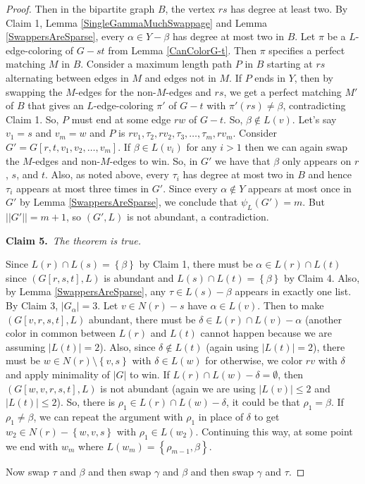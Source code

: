 \documentclass[12pt]{article}
\theoremstyle{plain}
\theoremstyle{definition}
\theoremstyle{remark}
\newcommand{\set}[1]{\left\{ #1 \right\}}
\newcommand{\claim}[2]{{\bf Claim #1.}~{\it #2}~~}
\begin{document}
\begin{proof}
			Then in the bipartite graph $B$, the vertex $rs$ has degree at least two.  By Claim 1, Lemma \ref{SingleGammaMuchSwappage} and Lemma \ref{SwappersAreSparse}, every $\alpha \in Y - \beta$ has degree at most two in $B$.  Let $\pi$ be a $L$-edge-coloring of $G-st$ from Lemma \ref{CanColorG-t}.  Then $\pi$ specifies a perfect matching $M$ in $B$.  Consider a maximum length path $P$ in $B$ starting at $rs$ alternating between edges in $M$ and edges not in $M$.  
			If $P$ ends in $Y$, then by swapping the $M$-edges for the non-$M$-edges and $rs$, we get a perfect matching $M'$ of $B$ that gives an $L$-edge-coloring $\pi'$ of $G-t$ with $\pi'(rs) \ne \beta$, contradicting Claim 1.  So, $P$ must end at some edge $rw$ of $G - t$.   So, $\beta \not \in L(v)$.  Let's say $v_1 = s$ and $v_m = w$ and $P$ is $rv_1,\tau_2, rv_2, \tau_3, \ldots, \tau_m, rv_m$.  Consider $G' = G[r,t,v_1, v_2, \ldots, v_m]$.  If $\beta \in L(v_i)$ for any $i > 1$ then we can again swap the $M$-edges and non-$M$-edges to win.   So, in $G'$ we have that $\beta$ only appears on $r$, $s$, and $t$.  Also, as noted above, every $\tau_i$ has degree at most two in $B$ and hence $\tau_i$ appears at most three times in $G'$.  Since every $\alpha \not \in Y$ appears at most once in $G'$ by Lemma \ref{SwappersAreSparse}, we conclude that $\psi_L(G') = m$.  But $||G'|| = m + 1$, so $(G', L)$ is not abundant, a contradiction.

		\claim{5}{The theorem is true.}
		
			 Since $L(r) \cap L(s) = \set{\beta}$ by Claim 1, there must be $\alpha \in L(r) \cap L(t)$ since $(G[r,s,t],L)$ is abundant and $L(s) \cap L(t) = \set{\beta}$ by Claim 4.  Also, by Lemma \ref{SwappersAreSparse}, any $\tau \in L(s) - \beta$ appears in exactly one list.  By Claim 3, $|G_\alpha| = 3$.  Let $v \in N(r) - s$ have $\alpha \in L(v)$.  Then to make $(G[v,r,s,t], L)$ abundant, there must be $\delta \in L(r) \cap L(v) - \alpha$ (another color in common between $L(r)$ and $L(t)$ cannot happen because we are assuming $|L(t)| = 2$).  Also, since $\delta \not \in L(t)$ (again using $|L(t)| = 2$), there must be $w \in N(r) \setminus \set{v,s}$ with $\delta \in L(w)$ for otherwise, we color $rv$ with $\delta$ and apply minimality of $|G|$ to win. If $L(r) \cap L(w) - \delta = \emptyset$, then $(G[w,v,r,s,t], L)$ is not abundant (again we are using $|L(v)| \le 2$ and $|L(t)| \le 2$).  So, there is $\rho_1 \in L(r) \cap L(w) - \delta$, it could be that $\rho_1 = \beta$.  If $\rho_1 \ne \beta$, we can repeat the argument with $\rho_1$ in place of $\delta$ to get $w_2 \in N(r) - \set{w, v,s}$ with $\rho_1 \in L(w_2)$.  Continuing this way, at some point we end with $w_m$ where $L(w_m) = \set{\rho_{m-1}, \beta}$.

			Now swap $\tau$ and $\beta$ and then swap $\gamma$ and $\beta$ and then swap $\gamma$ and $\tau$.
	\end{proof}



\end{document}
